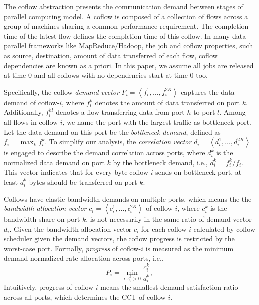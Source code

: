 \documentclass[10pt, conference, letterpaper]{IEEEtran}
\begin{document}
The coflow abstraction presents the communication demand between stages of parallel computing model. A coflow is composed of a collection of flows across a group of machines sharing a common performance requirement. The completion time of the latest flow defines the completion time of this coflow. In many data-parallel frameworks like MapReduce/Hadoop, the job and coflow properties, such as source, destination, amount of data transferred of each flow, coflow dependencies are known as a priori\cite{varys, aalo, bingchuan}. In this paper, we assume all jobs are released at time 0 and all coflows with no dependencies start at time 0 too.

Specifically, the coflow \emph{demand vector} $F_i = \left\langle f_i^1,\dots,f_i^{2K}\right\rangle$ captures the data demand of coflow-$i$, where $f_i^k$ denotes the amount of data transferred on port $k$. Additionally, $f_i^{hl}$ denotes a flow transferring data from port $h$ to port $l$. Among all flows in coflow-$i$, we name the port with the largest traffic as bottleneck port. Let the data demand on this port be the \emph{bottleneck demand}, defined as $\overline{f_i}=\max_{k} f_i^k$. To simplify our analysis, the \emph{correlation vector} $d_i = \left\langle d_i^1,\dots,d_i^{2K}\right\rangle$ is engaged to describe the demand correlation across ports, where $d_i^k$ is the normalized data demand on port $k$ by the bottleneck demand, i.e., $d_i^k = f_i^k/\overline{f_i}$. This vector indicates that for every byte coflow-$i$ sends on bottleneck port, at least $d_i^k$ bytes should be transferred on port $k$.
 
Coflows have elastic bandwidth demands on multiple ports, which means the the \emph{bandwidth allocation vector} $c_i=\left\langle c_i^1,\dots,c_i^{2K}\right\rangle$ of coflow-$i$, where $c_i^k$ is the bandwidth share on port $k$, is not necessarily in the same ratio of demand vector $d_i$. Given the bandwidth allocation vector $c_i$ for each coflow-$i$ calculated by coflow scheduler given the demand vectors, the coflow progress is restricted by the worst-case port. Formally, \emph{progress} of coflow-$i$ is measured as the minimum demand-normalized rate allocation across ports, i.e.,
 \begin{equation}
 	P_i = \min\limits_{i:d_i^k>0}\frac{c_i^k}{d_i^k},
 \end{equation}
 Intuitively, progress of coflow-$i$ means the smallest demand satisfaction ratio across all ports, which determines the CCT of coflow-$i$.
 
\end{document}
